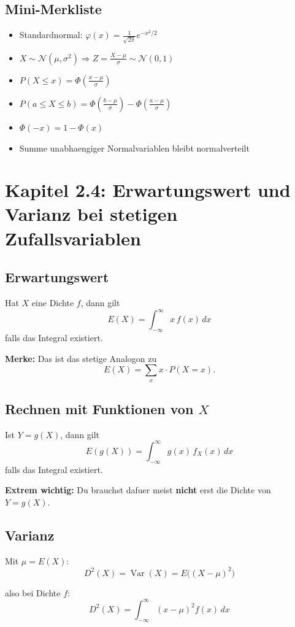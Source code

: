 \documentclass[a4paper,11pt]{article}
\begin{document}
\subsection{Mini-Merkliste}
\begin{itemize}
  \item Standardnormal: $\displaystyle \varphi(x)=\frac{1}{\sqrt{2\pi}}e^{-x^2/2}$
  \item $\displaystyle X\sim \mathcal N(\mu,\sigma^2)\Rightarrow Z=\frac{X-\mu}{\sigma}\sim \mathcal N(0,1)$
  \item $\displaystyle P(X\le x)=\Phi\left(\frac{x-\mu}{\sigma}\right)$
  \item $\displaystyle P(a\le X\le b)=\Phi\left(\frac{b-\mu}{\sigma}\right)-\Phi\left(\frac{a-\mu}{\sigma}\right)$
  \item $\displaystyle \Phi(-x)=1-\Phi(x)$
  \item Summe unabhaengiger Normalvariablen bleibt normalverteilt
\end{itemize}

\section{Kapitel 2.4: Erwartungswert und Varianz bei stetigen Zufallsvariablen}

\subsection{Erwartungswert}
Hat $X$ eine Dichte $f$, dann gilt
\[
E(X)=\int_{-\infty}^{\infty} x\,f(x)\,dx
\]
falls das Integral existiert.

\textbf{Merke:}
Das ist das stetige Analogon zu
\[
E(X)=\sum_x x\cdot P(X=x).
\]

\subsection{Rechnen mit Funktionen von $X$}
Ist $Y=g(X)$, dann gilt
\[
E(g(X))=\int_{-\infty}^{\infty} g(x)\,f_X(x)\,dx
\]
falls das Integral existiert.

\textbf{Extrem wichtig:}
Du brauchst dafuer meist \textbf{nicht} erst die Dichte von $Y=g(X)$.

\subsection{Varianz}
Mit $\mu=E(X)$:
\[
D^2(X)=\operatorname{Var}(X)=E\bigl((X-\mu)^2\bigr)
\]

also bei Dichte $f$:
\[
D^2(X)=\int_{-\infty}^{\infty} (x-\mu)^2 f(x)\,dx
\]
\end{document}
